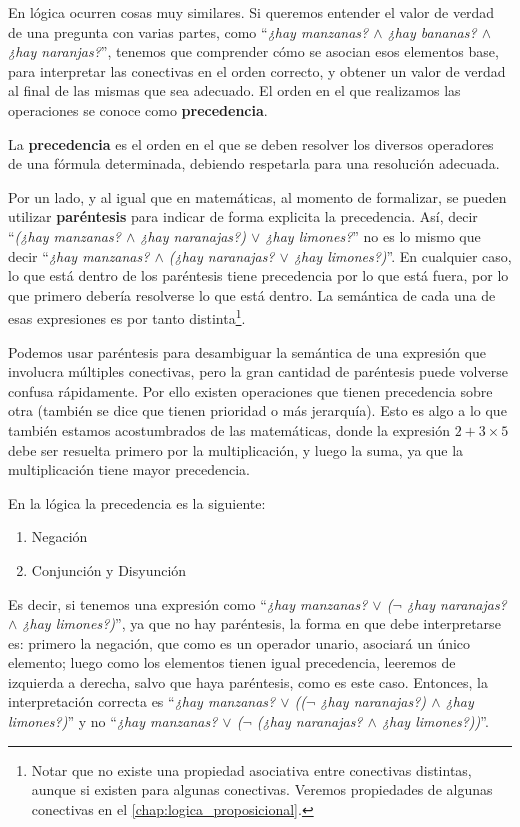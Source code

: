 En lógica ocurren cosas muy similares. Si queremos entender el valor de verdad
de una pregunta con varias partes, como ``\textit{¿hay manzanas? $\land$ ¿hay
bananas? $\land$ ¿hay naranjas?}'', tenemos que comprender cómo se asocian esos
elementos base, para interpretar las conectivas en el orden correcto, y obtener
un valor de verdad al final de las mismas que sea adecuado. El orden en el que
realizamos las operaciones se conoce como \textbf{precedencia}.

\begin{definition} La \textbf{precedencia} es el orden en el
    que se deben resolver los diversos operadores de una fórmula determinada,
    debiendo respetarla para una resolución adecuada.
\end{definition}

Por un lado, y al igual que en matemáticas, al momento de formalizar, se pueden
utilizar \textbf{paréntesis} para indicar de forma explicita la precedencia.
Así, decir ``\textit{(¿hay manzanas? $\land$ ¿hay naranajas?) $\lor$ ¿hay
limones?}'' no es lo mismo que decir ``\textit{¿hay manzanas? $\land$ (¿hay
naranajas? $\lor$  ¿hay limones?)}''. En cualquier caso, lo que está dentro de
los paréntesis tiene precedencia por lo que está fuera, por lo que primero
debería resolverse lo que está dentro. La semántica de cada una de esas
expresiones es por tanto distinta\footnote{ Notar que no existe una propiedad
asociativa entre conectivas distintas, aunque si existen para algunas
conectivas. Veremos propiedades de algunas conectivas en el
\autoref{chap:logica_proposicional}. }.

Podemos usar paréntesis para desambiguar la semántica de una expresión que
involucra múltiples conectivas, pero la gran cantidad de paréntesis puede
volverse confusa rápidamente. Por ello existen operaciones que tienen
precedencia sobre otra (también se dice que tienen prioridad o más jerarquía).
Esto es algo a lo que también estamos acostumbrados de las matemáticas, donde la
expresión $2 + 3 \times 5$ debe ser resuelta primero por la multiplicación, y
luego la suma, ya que la multiplicación tiene mayor precedencia.

En la lógica la precedencia es la siguiente:
\begin{enumerate}
    \item Negación
    \item Conjunción y Disyunción
\end{enumerate}

Es decir, si tenemos una expresión como ``\textit{¿hay manzanas? $\lor$ ($\lnot$
¿hay naranajas? $\land$ ¿hay limones?)}'', ya que no hay paréntesis, la forma en
que debe interpretarse es: primero la negación, que como es un operador unario,
asociará un único elemento; luego como los elementos tienen igual precedencia,
leeremos de izquierda a derecha, salvo que haya paréntesis, como es este caso.
Entonces, la interpretación correcta es  ``\textit{¿hay manzanas? $\lor$
(($\lnot$ ¿hay naranajas?) $\land$ ¿hay limones?)}'' y no ``\textit{¿hay
manzanas? $\lor$ ($\lnot$ (¿hay naranajas? $\land$ ¿hay limones?))}''.


